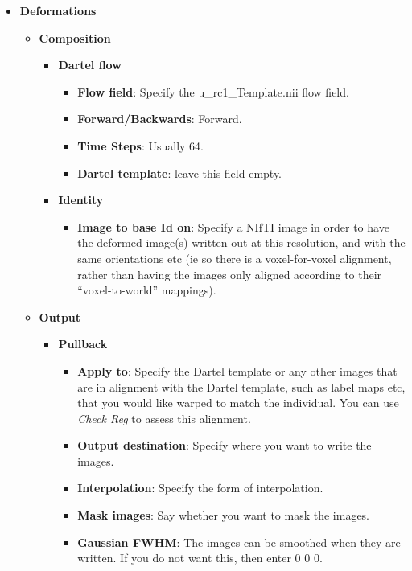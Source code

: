\begin{itemize}
\item {\bf Deformations}
  \begin{itemize}
  \item {\bf Composition}
    \begin{itemize}
    \item {\bf Dartel flow}
      \begin{itemize}
      \item {\bf Flow field}: Specify the u\_rc1\*\_Template.nii flow field.
      \item {\bf Forward/Backwards}: Forward.
      \item {\bf Time Steps}: Usually 64.
      \item {\bf Dartel template}: leave this field empty.
      \end{itemize}
    \item {\bf Identity}
      \begin{itemize}
      \item {\bf Image to base Id on}: Specify a NIfTI image in order to have the deformed image(s) written out at this resolution, and with the same orientations etc (ie so there is a voxel-for-voxel alignment, rather than having the images only aligned according to their ``voxel-to-world'' mappings).
      \end{itemize}
    \end{itemize}
  \item {\bf Output}
    \begin{itemize}
    \item {\bf Pullback}
      \begin{itemize}
      \item {\bf Apply to}: Specify the Dartel template or any other images that are in alignment with the Dartel template, such as label maps etc, that you would like warped to match the individual. You can use \emph{Check Reg} to assess this alignment.
      \item {\bf Output destination}: Specify where you want to write the images.
      \item {\bf Interpolation}: Specify the form of interpolation.
      \item {\bf Mask images}: Say whether you want to mask the images.
      \item {\bf Gaussian FWHM}: The images can be smoothed when they are written.  If you do not want this, then enter 0 0 0.
      \end{itemize}
    \end{itemize}
  \end{itemize}
\end{itemize}

